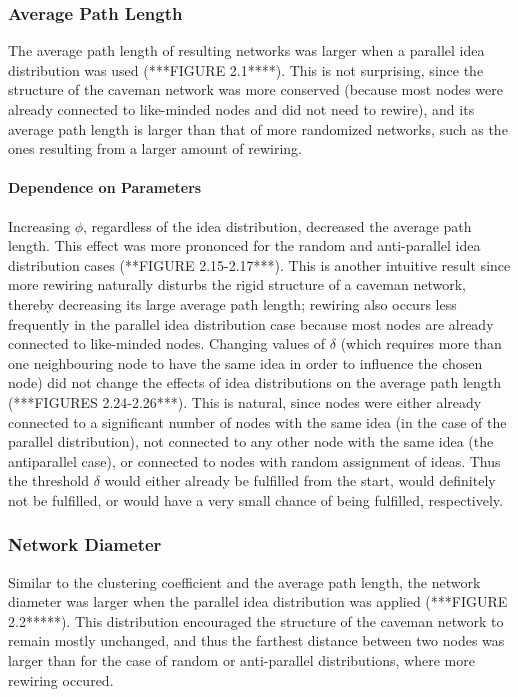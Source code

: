 \subsubsection{Average Path Length}
The average path length of resulting networks was larger when a parallel idea distribution was used (***FIGURE 2.1****). This is not surprising, since the structure of the caveman network was more conserved (because most nodes were already connected to like-minded nodes and did not need to rewire), and its average path length is larger than that of more randomized networks, such as the ones resulting from a larger amount of rewiring. 
\paragraph{Dependence on Parameters}
Increasing $\phi$, regardless of the idea distribution, decreased the average path length. This effect was more prononced for the random and anti-parallel idea distribution cases (**FIGURE 2.15-2.17***). This is another intuitive result since more rewiring naturally disturbs the rigid structure of a caveman network, thereby decreasing its large average path length; rewiring also occurs less frequently in the parallel idea distribution case because most nodes are already connected to like-minded nodes.
Changing values of $\delta$ (which requires more than one neighbouring node to have the same idea in order to influence the chosen node) did not change the effects of idea distributions on the average path length (***FIGURES 2.24-2.26***). This is natural, since nodes were either already connected to a significant number of nodes with the same idea (in the case of the parallel distribution), not connected to any other node with the same idea (the antiparallel case), or connected to nodes with random assignment of ideas. Thus the threshold $\delta$ would either already be fulfilled from the start, would definitely not be fulfilled, or would have a very small chance of being fulfilled, respectively.


\subsubsection{Network Diameter}
Similar to the clustering coefficient and the average path length, the network diameter was larger when the parallel idea distribution was applied (***FIGURE 2.2*****). This distribution encouraged the structure of the caveman network to remain mostly unchanged, and thus the farthest distance between two nodes was larger than for the case of random or anti-parallel distributions, where more rewiring occured. 
